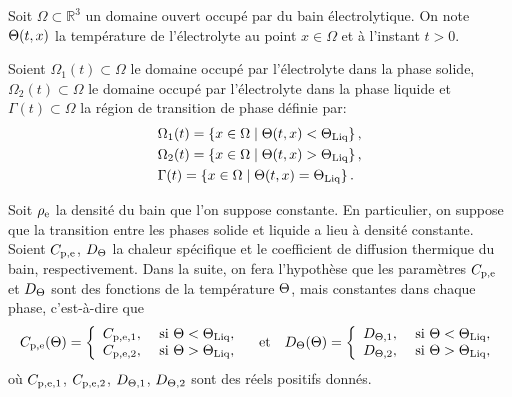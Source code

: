 Soit $\Omega\subset \mathbb R^3$ un domaine ouvert occupé par du bain
électrolytique. On note $\Theta(t, x)$ la température de
l'électrolyte au point $x \in \Omega$ et à l'instant $t > 0$.

Soient $\Omega_1(t)\subset \Omega$ le domaine occupé par l'électrolyte
dans la phase solide, $\Omega_2(t)\subset \Omega$ le domaine occupé
par l'électrolyte dans la phase liquide et $\Gamma(t) \subset \Omega$
la région de transition de phase définie par:
\begin{align}\label{eq:phase-domains}
  &\Omega_1(t) = \cparent{x\in\Omega \mid %
                         \temperature(t, x) < \tliq},\\
  &\Omega_2(t) = \cparent{x\in\Omega \mid \temperature(t, x) %
    > \tliq},\\
  &\Gamma(t) = \cparent{x\in\Omega\mid \temperature(t, x) = \tliq}.
\end{align}

Soit $\rho_\mathrm{e}$ la densité du bain que l'on suppose
constante. En particulier, on suppose que la transition entre les
phases solide et liquide a lieu à densité constante.
Soient $C_{\mathrm{p,e}}$, $D_\Theta$ la chaleur
spécifique et le coefficient de diffusion thermique du bain,
respectivement. Dans la suite, on fera l'hypothèse que les paramètres
$C_{\mathrm{p,e}}$ et $D_\Theta$ sont des fonctions de la
température $\Theta$, mais constantes dans chaque phase,
c'est-à-dire que
\begin{equation}
  C_{\mathrm{p,e}}(\Theta) = \left\{
  \begin{array}{ll}
    C_{\mathrm{p,e,1}}, & \text{ si } \Theta < \Theta_\text{Liq},\\
    C_{\mathrm{p,e,2}}, & \text{ si } \Theta > \Theta_\text{Liq},
  \end{array}
  \right.
  \quad\text{et}\quad
  D_\Theta(\Theta) = \left\{
  \begin{array}{ll}
    D_{\Theta,\mathrm{1}}, & \text{ si } \Theta < \Theta_\text{Liq},\\
    D_{\Theta,\mathrm{2}}, & \text{ si } \Theta > \Theta_\text{Liq},
  \end{array}
  \right.
\end{equation}
où $C_{\mathrm{p,e,1}}$, $C_{\mathrm{p,e,2}}$, $D_{\Theta,\mathrm{1}}$,
$D_{\Theta,\mathrm{2}}$ sont des réels positifs donnés.

